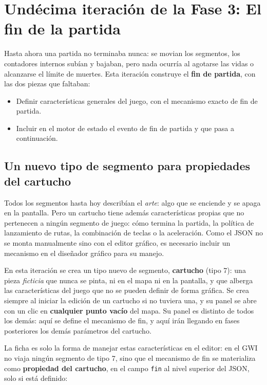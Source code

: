 \section{Undécima iteración de la Fase 3: El fin de la partida}
\label{sec:FinPartida}

Hasta ahora una partida no terminaba nunca: se movian los segmentos,  los contadores internos subían y
bajaban, pero nada ocurría al agotarse las vidas o alcanzarse el límite de
muertes. Esta iteración construye el \textbf{fin de partida}, con las dos piezas que faltaban:
\begin{itemize}
	\item Definir características generales del juego, con el mecanismo exacto de fin de partida.
	\item Incluir en el motor de estado el evento de fin de partida y que pasa a continuación.
\end{itemize}

\subsection{Un nuevo tipo de segmento para propiedades del cartucho}
\label{subsec:SegmentoCartuchoF3I11}

Todos los segmentos hasta hoy describían el \emph{arte}: algo que se enciende y se
apaga en la pantalla. Pero un cartucho tiene además características propias
que no pertenecen a ningún segmento de juego: cómo termina la partida, la política de lanzamiento de rutas, la combinación de teclas o la aceleración. Como el JSON no se monta manualmente sino con el editor gráfico, es necesario incluir un mecanismo en el diseñador gráfico para su manejo.

En esta iteración se crea un tipo nuevo de segmento,
\textbf{cartucho} (tipo 7): una pieza \emph{ficticia} que nunca se pinta, ni
en el mapa ni en la pantalla, y que alberga las características del juego que no se pueden definir de forma gráfica. Se crea siempre al iniciar la edición de un
cartucho si no tuviera una, y su panel se abre con un clic en
\textbf{cualquier punto vacío} del mapa. Su panel es distinto de todos
los demás: aquí se define el mecanismo de fin, y aquí irán llegando en fases
posteriores los demás parámetros del cartucho.

La ficha es solo la forma de manejar estas características en el editor: en el
GWI no viaja ningún segmento de tipo 7, sino que el mecanismo de fin se
materializa como \textbf{propiedad del cartucho}, en el campo \texttt{fin} al
nivel superior del JSON, solo si está definido:

